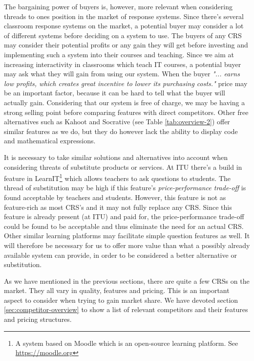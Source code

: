 The bargaining power of buyers is, however, more relevant when considering threads to ones position in the market of response systems. Since there's several classroom response systems on the market, a potential buyer may consider a lot of different systems before deciding on a system to use. The buyers of any CRS may consider their potential profits or any gain they will get before investing and implementing such a system into their courses and teaching. Since we aim at increasing interactivity in classrooms which teach IT courses, a potential buyer may ask what they will gain from using our system. When the buyer \emph{"... earns low profits, which creates great incentive to lower its purchasing costs."} \cite[p.~141]{porter1979competitive} price may be an important factor, because it can be hard to tell what the buyer will actually gain. Considering that our system is free of charge, we may be having a strong selling point before comparing features with direct competitors. Other free alternatives such as Kahoot and Socrative (see Table \ref{tab:overview-2}) offer similar features as we do, but they do however lack the ability to display code and mathematical expressions.


It is necessary to take similar solutions and alternatives into account when considering threats of substitute products or services. At ITU there's a build in feature in LearnIT\footnote{A system based on Moodle which is an open-source learning platform. See \url{https://moodle.org}} which allows teachers to ask questions to students. The thread of substitution may be high if this feature's \emph{price-performance trade-off} is found acceptable by teachers and students. However, this feature is not as feature-rich as most CRS's and it may not fully replace any CRS. Since this feature is already present (at ITU) and paid for, the price-performance trade-off could be found to be acceptable and thus eliminate the need for an actual CRS. Other similar learning platforms may facilitate simple question features as well. It will therefore be necessary for us to offer more value than what a possibly already available system can provide, in order to be considered a better alternative or substitution. 


As we have mentioned in the previous sections, there are quite a few CRSs on the market. They all vary in quality, features and pricing. This is an important aspect to consider when trying to gain market share. We have devoted section \ref{sec:competitor-overview} to show a list of relevant competitors and their features and pricing structures.








